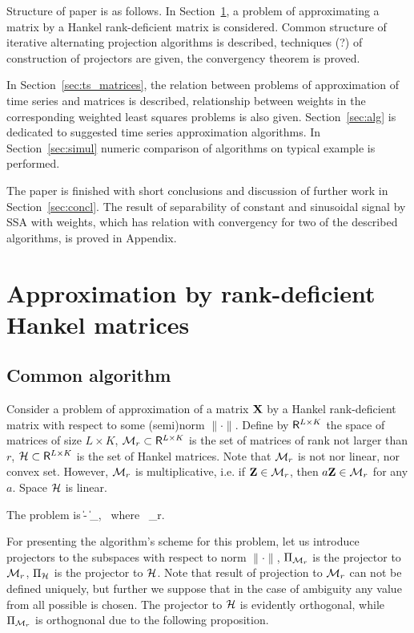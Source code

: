 \documentclass[sii]{ipart}
\begin{document}
Structure of paper is as follows.  In Section~\ref{sec:lowrank_appr}, a problem of approximating a matrix by a Hankel rank-deficient matrix is considered. Common structure of iterative alternating projection algorithms is described, techniques (?) of construction of projectors are given, the convergency theorem is proved.

In Section~\ref{sec:ts_matrices}, the relation between problems of approximation of time series and matrices is described, relationship between weights in the corresponding weighted least squares problems is also given. Section~\ref{sec:alg} is dedicated to suggested time series approximation algorithms. In Section~\ref{sec:simul} numeric comparison of algorithms on typical example is performed.

The paper is finished with short conclusions and discussion of further work in Section~\ref{sec:concl}. The result of separability of constant and sinusoidal signal by SSA with weights, which has relation with convergency for two of the described algorithms, is proved in Appendix.

\section{Approximation by rank-deficient Hankel matrices}
\label{sec:lowrank_appr}
\subsection{Common algorithm}
Consider a problem of approximation of a matrix $\mathbf{X}$ by a Hankel rank-deficient matrix with respect to some (semi)norm $\|\cdot\|$. Define by $\mathsf{R}^{L\times K}$ the space of matrices of size $L \times K$, $\mathcal{M}_r\subset \mathsf{R}^{L\times K}$ is the set of matrices of rank not larger than $r$,
$\mathcal{H} \subset \mathsf{R}^{L\times K}$ is the set of Hankel matrices.
Note that  $\mathcal{M}_r$ is not nor linear, nor convex set. However, $\mathcal{M}_r$ is multiplicative, i.e.
if $\mathbf{Z}\in \mathcal{M}_r$, then $a\mathbf{Z}\in \mathcal{M}_r$ for any $a$.
Space $\mathcal{H}$ is linear.

The problem is
\be
\label{eq:gen_task}
\|\bfX - \bfY\| \to \min_\bfY, \mbox{\ where\ } \bfY \in \calH \cap \calM_r.
\ee

For presenting the algorithm's scheme for this problem, let us introduce projectors to the subspaces with respect to norm $\|\cdot\|$, $\Pi_{\mathcal{M}_r}$ is the projector to $\mathcal{M}_r$,
$\Pi_{\mathcal{H}}$ is the projector to $\mathcal{H}$.
Note that result of projection to $\mathcal{M}_r$ can not be defined uniquely, but further we suppose that in the case of ambiguity any value from all possible is chosen. The projector to $\mathcal{H}$ is evidently orthogonal, while $\Pi_{\mathcal{M}_r}$ is orthognonal due to the following proposition.
\end{document}
